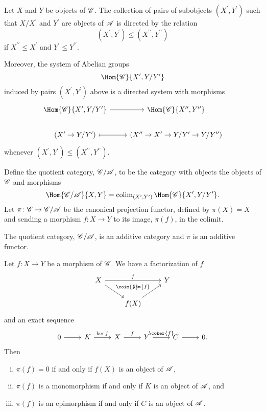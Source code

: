 \documentclass[10pt]{amsart}
\begin{document}
\begin{prop}
  Let $X$ and $Y$ be objects of $\mathscr{C}$.
  The collection of pairs of subobjects $(X^\prime, Y^\prime)$ such that $X/X^\prime$ and $Y^\prime$ are objects of $\mathscr{A}$ is directed by the relation
  $$(X^\prime, Y^\prime) \leq (X^{\prime\prime}, Y^{\prime\prime})$$
  if $X^{\prime\prime} \leq X^\prime$ and $Y^\prime \leq Y^{\prime\prime}$.
  
  Moreover, the system of Abelian groups
  $$\Hom{\C}{X^\prime, Y/Y^\prime}$$
  induced by pairs $(X^\prime, Y^\prime)$ above is a directed system with morphisms
  $$\begin{tikzcd}
    \Hom{\C}{X^\prime, Y/Y^\prime} \arrow{r} &\Hom{\C}{X^{\prime\prime}, Y^{\prime\prime}}\\
    (X^\prime \rightarrow Y/Y^\prime) \arrow[mapsto]{r} & (X^{\prime\prime} \rightarrow X^\prime \rightarrow Y/Y^\prime \rightarrow Y/Y^{\prime\prime})
  \end{tikzcd}$$
  whenever $(X^\prime, Y^\prime) \leq (X^{\prime\prime}, Y^{\prime\prime})$.
\end{prop}

\begin{defn}
  Define the quotient category, $\mathscr{C}/\mathscr{A}$, to be the category with objects the objects of $\mathscr{C}$ and morphisms
  $$\Hom{\C/\A}{X, Y} = \operatorname{colim}_{(X^\prime, Y^\prime)} \Hom{\C}{X^\prime, Y/Y^\prime}.$$
  Let $\pi \colon \mathscr{C} \rightarrow \mathscr{C}/\mathscr{A}$ be the canonical projection functor, defined by $\pi(X) = X$ and sending a morphism $f \colon X \rightarrow Y$ to its image, $\pi(f)$, in the colimit.
\end{defn}

\begin{lem}
  The quotient category, $\mathscr{C}/\mathscr{A}$, is an additive category and $\pi$ is an additive functor.
\end{lem}

\begin{lem}
  Let $f \colon X \rightarrow Y$ be a morphism of $\mathscr{C}$.  
  We have a factorization of $f$
  $$\begin{tikzcd}
    X \arrow{rd}{\coim{f}}\arrow{rr}{f} & & Y\\
    & f(X)\arrow{ur}{\im{f}} & 
  \end{tikzcd}$$
  and an exact sequence 
  $$\begin{tikzcd}
    0 \arrow{r} & K \arrow{r}{\ker{f}} & X \arrow{r}{f} & Y \arrow{r}{\coker{f}} & C \arrow{r} & 0.
  \end{tikzcd}$$
  Then
  \begin{enumerate}[(i)]
  \item
    $\pi(f) = 0$ if and only if $f(X)$ is an object of $\mathscr{A}$,
  \item
    $\pi(f)$ is a monomorphism if and only if $K$ is an object of $\mathscr{A}$, and
  \item
    $\pi(f)$ is an epimorphism if and only if $C$ is an object of $\mathscr{A}$.
  \end{enumerate}
\end{lem}
\end{document}
